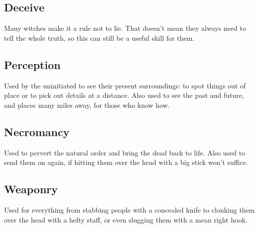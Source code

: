 \subsection{Deceive}

Many witches make it a rule not to lie.
That doesn't mean they always need to tell the whole truth, so this can still be a useful skill for them.

\subsection{Perception}

Used by the uninitiated to see their present surroundings: to spot things out of place or to pick out details at a distance.
Also used to see the past and future, and places many miles away, for those who know how.

\subsection{Necromancy}

Used to pervert the natural order and bring the dead back to life.
Also used to send them on again, if hitting them over the head with a big stick won't suffice.

\subsection{Weaponry}
\govdisc{} %

Used for everything from stabbing people with a concealed knife to clonking them over the head with a hefty staff, or even slugging them with a mean right hook.
